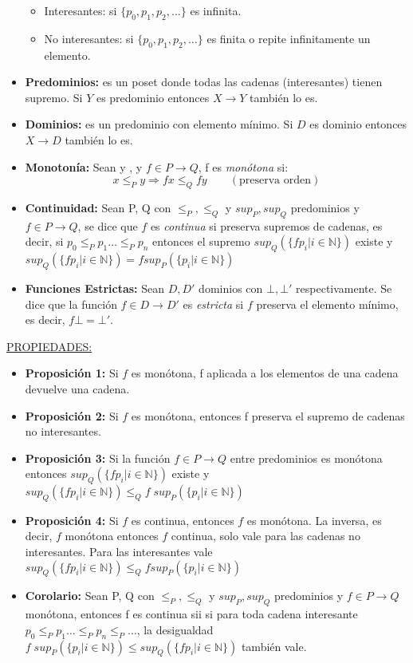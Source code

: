 \begin{itemize}
      \begin{itemize}
        \item Interesantes: si $\{p_0, p_1, p_2, \dotsc\}$ es infinita.
        \item No interesantes: si $\{p_0, p_1, p_2, \dotsc\}$ es finita o repite infinitamente un elemento.
      \end{itemize}
    \item \textbf{Predominios:} es un poset donde todas las cadenas (interesantes) tienen supremo.
      \PN Si $Y$ es predominio entonces $X \rightarrow Y$ también lo es.
    \item \textbf{Dominios:} es un predominio con elemento mínimo.
    \PN Si $D$ es dominio entonces $X \rightarrow D$ también lo es.
    \item \textbf{Monotonía:} Sean  y , y $f \in P \rightarrow Q$, f es \textit{monótona} si:
      \[
        x \leq_P y \Rightarrow f x \leq_Q f y \qquad (\text{preserva orden})
      \]
    \item \textbf{Continuidad:} Sean P, Q con $\leq_P, \leq_Q$ y $sup_P, sup_Q$ predominios y $f \in P \rightarrow Q$, se dice que $f$ es \textit{continua} si preserva supremos de cadenas, es decir, si $p_0 \leq_P p_1 \dotsc \leq_P p_n$ entonces el supremo $sup_Q(\{f p_i | i \in \mathbb{N}\})$ existe y $sup_Q(\{f p_i | i \in \mathbb{N}\}) = f sup_P(\{p_i | i \in \mathbb{N}\})$
    \item \textbf{Funciones Estrictas:} Sean $D, D'$ dominios con $\bot, \bot'$ respectivamente. Se dice que la función $f \in D \rightarrow D'$ es \textit{estricta} si $f$ preserva el elemento mínimo, es decir, $f \bot = \bot'$.
  \end{itemize}

  \PN \underline{PROPIEDADES:}
    \begin{itemize}
      \item \textbf{Proposición 1:} Si $f$ es monótona, f aplicada a los elementos de una cadena devuelve una cadena.
      \item \textbf{Proposición 2:} Si $f$ es monótona, entonces f preserva el supremo de cadenas no interesantes.
      \item \textbf{Proposición 3:} Si la función $f \in P \rightarrow Q$ entre predominios es monótona entonces $sup_Q(\{f p_i | i \in \mathbb{N}\})$ existe y $sup_Q(\{f p_i | i \in \mathbb{N}\}) \leq_Q f \; sup_P(\{p_i | i \in \mathbb{N}\})$
      \item \textbf{Proposición 4:} Si $f$ es continua, entonces $f$ es monótona.
        \PN La inversa, es decir, $f$ monótona entonces $f$ continua, solo vale para las cadenas no interesantes. Para las interesantes vale $sup_Q(\{f p_i | i \in \mathbb{N}\}) \leq_Q f sup_P(\{p_i | i \in \mathbb{N}\})$
      \item \textbf{Corolario:} Sean P, Q con $\leq_P, \leq_Q$ y $sup_P, sup_Q$ predominios y $f \in P \rightarrow Q$ monótona, entonces f es continua sii si para toda cadena interesante $p_0 \leq_P p_1 \dotsc \leq_P p_n \leq_P \dotsc$, la desigualdad $f \; sup_P(\{p_i | i \in \mathbb{N}\}) \leq sup_Q(\{f p_i | i \in \mathbb{N}\})$ también vale.
    \end{itemize}

